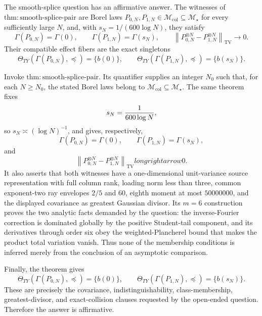 The smooth-splice question has an affirmative answer.  The witnesses of \(\mathrm{thm:smooth\text{-}splice\text{-}pair}\) are Borel laws \(P_{0,N},P_{1,N}\in\mathcal M_{\mathrm{col}}\subseteq\mathcal M_\star\) for every sufficiently large \(N\), and, with \(s_N=1/(600\log N)\), they satisfy
\[
 \Gamma(P_{0,N})=\Gamma(0),\qquad
 \Gamma(P_{1,N})=\Gamma(s_N),\qquad
 \left\|P_{0,N}^{\otimes N}-P_{1,N}^{\otimes N}\right\|_{\mathrm{TV}}\longrightarrow0.
\]
Their compatible effect fibers are the exact singletons
\[
 \Theta_{TY}(\Gamma(P_{0,N}),\preceq)=\{b(0)\},\qquad
 \Theta_{TY}(\Gamma(P_{1,N}),\preceq)=\{b(s_N)\}.
\]

Invoke \(\mathrm{thm:smooth\text{-}splice\text{-}pair}\).  Its quantifier supplies an integer \(N_0\) such that, for each \(N\ge N_0\), the stated Borel laws belong to \(\mathcal M_{\mathrm{col}}\subseteq\mathcal M_\star\).  The same theorem fixes
\[
 s_N={1\over600\log N},
\]
so \(s_N\asymp(\log N)^{-1}\), and gives, respectively,
\[
 \Gamma(P_{0,N})=\Gamma(0),\qquad
 \Gamma(P_{1,N})=\Gamma(s_N),
\]
and
\[
 \left\|P_{0,N}^{\otimes N}-P_{1,N}^{\otimes N}\right\|_{\mathrm{TV}}longrightarrow0.
\]
It also asserts that both witnesses have a one-dimensional unit-variance source representation with full column rank, loading norm less than three, common exponent-two ray envelopes \(2/5\) and \(60\), eighth moment at most \(50000000\), and the displayed covariance as greatest Gaussian divisor.  Its \(m=6\) construction proves the two analytic facts demanded by the question: the inverse-Fourier correction is dominated globally by the positive Student-tail component, and its derivatives through order six obey the weighted-Plancherel bound that makes the product total variation vanish.  Thus none of the membership conditions is inferred merely from the conclusion of an asymptotic comparison.

Finally, the theorem gives
\[
 \Theta_{TY}(\Gamma(P_{0,N}),\preceq)=\{b(0)\},\qquad
 \Theta_{TY}(\Gamma(P_{1,N}),\preceq)=\{b(s_N)\}.
\]
These are precisely the covariance, indistinguishability, class-membership, greatest-divisor, and exact-collision clauses requested by the open-ended question.  Therefore the answer is affirmative.
